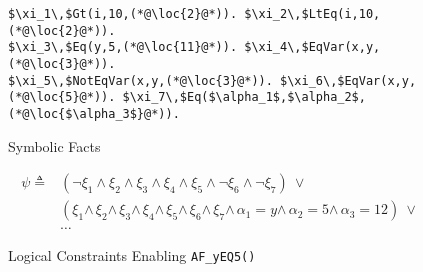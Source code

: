 \begin{figure}[!b]
\vspace{-1mm}
\centering
\begin{lstlisting}[xleftmargin=0.3em,numbers=none,basicstyle=\footnotesize\ttfamily,mathescape]
$\xi_1\,$Gt(i,10,(*@\loc{2}@*)). $\xi_2\,$LtEq(i,10,(*@\loc{2}@*)).
$\xi_3\,$Eq(y,5,(*@\loc{11}@*)). $\xi_4\,$EqVar(x,y,(*@\loc{3}@*)). 
$\xi_5\,$NotEqVar(x,y,(*@\loc{3}@*)). $\xi_6\,$EqVar(x,y,(*@\loc{5}@*)). $\xi_7\,$Eq($\alpha_1$,$\alpha_2$,(*@\loc{$\alpha_3$}@*)).
\end{lstlisting}
\caption{Symbolic Facts}
\label{fig:symbolicEDBexample}
\vspace{-1mm}
\end{figure}

 
\begin{figure}[!b]
\begin{align*}
\psi \triangleq& 
  (\neg \xi_1 \wedge \xi_2 \wedge \xi_3 \wedge \xi_4 \wedge \xi_5 \wedge \neg \xi_6 \wedge \neg \xi_7) \ \vee\, 
  \\
  & (\xi_1 {\wedge\,} \xi_2 {\wedge\,} \xi_3 {\wedge\,} \xi_4 {\wedge\,} \xi_5 {\wedge\,} \xi_6 {\wedge\,} \xi_7 {\wedge\,} \alpha_1{=}y {\wedge\,} \alpha_2 {=} 5 {\wedge\,} \alpha_3 {=} 12) \ \vee\\
  &  \dots
  \end{align*}
\vspace{-1mm}
\caption{Logical Constraints Enabling \lstinline|AF_yEQ5(|\lstinline|)| }
\label{fig:SEDLLogical_Constraints}
\end{figure}






